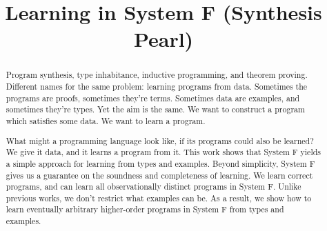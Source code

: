 \documentclass[acmsmall]{acmart}
\theoremstyle{mytheoremstyle}
\begin{document}
\title{Learning in System F (Synthesis Pearl)}



\author{}

\begin{abstract}
Program synthesis, type inhabitance, inductive programming, and theorem proving. Different names for the same problem: learning programs from data. Sometimes the programs are proofs, sometimes they’re terms. Sometimes data are examples, and sometimes they’re types. Yet the aim is the same. We want to construct a program which satisfies some data. We want to learn a program.

What might a programming language look like, if its programs could also be learned? We give it data, and it learns a program from it. This work shows that System F yields a simple approach for learning from types and examples. Beyond simplicity, System F gives us a guarantee on the soundness and completeness of learning. We learn correct programs, and can learn all observationally distinct programs in System F. Unlike previous works, we don't restrict what examples can be. As a result, we show how to learn eventually arbitrary higher-order programs in System F from types and examples. 

\end{abstract}
\end{document}
